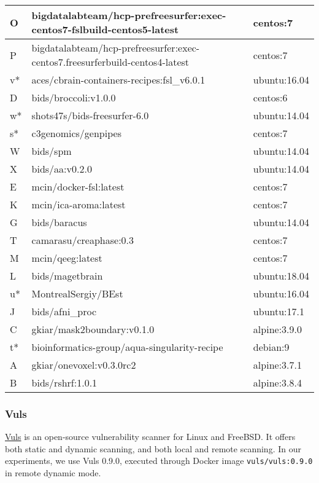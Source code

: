\begin{center}
\begin{longtable} {| p{} | p{} | p{} |}
\hline
	O   &  bigdatalabteam/hcp-prefreesurfer:exec-centos7-fslbuild-centos5-latest  &  centos:7 \\	
\hline
	P   &  bigdatalabteam/hcp-prefreesurfer:exec-centos7.freesurferbuild-centos4-latest  &  centos:7	\\
\hline
	v*   &  aces/cbrain-containers-recipes:fsl\_v6.0.1  &  ubuntu:16.04	\\
\hline
	D   &  bids/broccoli:v1.0.0  &  centos:6	\\
\hline
	w*   &  shots47s/bids-freesurfer-6.0  &  ubuntu:14.04	\\
\hline
	s*   &  c3genomics/genpipes  &  centos:7	\\
\hline
	W   &  bids/spm  &  ubuntu:14.04	\\
\hline
	X   &  bids/aa:v0.2.0  &  ubuntu:14.04	\\
\hline
	E   &  mcin/docker-fsl:latest  &  centos:7 \\	
\hline
	K   &  mcin/ica-aroma:latest  &  centos:7 \\	
\hline
	G   &  bids/baracus  &  ubuntu:14.04	\\
\hline
	T   &  camarasu/creaphase:0.3  &  centos:7 \\	
\hline
	M   &  mcin/qeeg:latest  &  centos:7	\\
\hline
	L   &  bids/magetbrain  &  ubuntu:18.04	\\
\hline
	u*   &  MontrealSergiy/BEst  &  ubuntu:16.04 \\	
\hline
	J   &  bids/afni\_proc  &  ubuntu:17.1	\\
\hline
	C   &  gkiar/mask2boundary:v0.1.0  &  alpine:3.9.0	\\
\hline
	t*   &  bioinformatics-group/aqua-singularity-recipe  &  debian:9	\\
\hline
	A   &  gkiar/onevoxel:v0.3.0rc2  &  alpine:3.7.1	\\
\hline
	B   &  bids/rshrf:1.0.1  &  alpine:3.8.4	\\
 \hline
\end{longtable}
\label{tab:images}
\end{center}
\subsubsection{Vuls}

\href{https://github.com/future-architect/vuls}{Vuls} is an open-source vulnerability scanner for Linux and FreeBSD. It
offers both static and dynamic scanning, and both local and remote
scanning. In our experiments, we use Vuls 0.9.0, executed through Docker image
\texttt{vuls/vuls:0.9.0} in remote dynamic mode.

